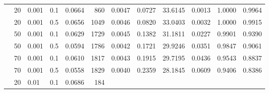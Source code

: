 \begin{table}[H]
{\begin{tabular}{llllrrrrrrrr}
 		\hlineB{5.5}
 		\multirow{12}{*}{amazon} & 20 & 0.001 & 0.1 & {\cellcolor[HTML]{2929FD}} \color[HTML]{F1F1F1} 0.0664 & {\cellcolor[HTML]{8D8DF8}} \color[HTML]{F1F1F1} 860 & {\cellcolor[HTML]{3535FC}} \color[HTML]{F1F1F1} 0.0047 & {\cellcolor[HTML]{DBDBF4}} \color[HTML]{000000} 0.0727 & {\cellcolor[HTML]{2A2AFD}} \color[HTML]{F1F1F1} 33.6145 & {\cellcolor[HTML]{ECECF3}} \color[HTML]{000000} 0.0013 & {\cellcolor[HTML]{0000FF}} \color[HTML]{F1F1F1} 1.0000 & {\cellcolor[HTML]{0505FF}} \color[HTML]{F1F1F1} 0.9964 \\ & 20 & 0.001 & 0.5 & {\cellcolor[HTML]{3838FC}} \color[HTML]{F1F1F1} 0.0656 & {\cellcolor[HTML]{7272F9}} \color[HTML]{F1F1F1} 1049 & {\cellcolor[HTML]{5050FB}} \color[HTML]{F1F1F1} 0.0046 & {\cellcolor[HTML]{CECEF4}} \color[HTML]{000000} 0.0820 & {\cellcolor[HTML]{3F3FFC}} \color[HTML]{F1F1F1} 33.0403 & {\cellcolor[HTML]{E4E4F3}} \color[HTML]{000000} 0.0032 & {\cellcolor[HTML]{0000FF}} \color[HTML]{F1F1F1} 1.0000 & {\cellcolor[HTML]{0C0CFE}} \color[HTML]{F1F1F1} 0.9915 \\ & 50 & 0.001 & 0.1 & {\cellcolor[HTML]{6B6BFA}} \color[HTML]{F1F1F1} 0.0629 & {\cellcolor[HTML]{0E0EFE}} \color[HTML]{F1F1F1} 1729 & {\cellcolor[HTML]{6B6BFA}} \color[HTML]{F1F1F1} 0.0045 & {\cellcolor[HTML]{8383F8}} \color[HTML]{F1F1F1} 0.1382 & {\cellcolor[HTML]{8383F8}} \color[HTML]{F1F1F1} 31.1811 & {\cellcolor[HTML]{9797F7}} \color[HTML]{F1F1F1} 0.0227 & {\cellcolor[HTML]{2828FD}} \color[HTML]{F1F1F1} 0.9901 & {\cellcolor[HTML]{5B5BFA}} \color[HTML]{F1F1F1} 0.9390 \\ & 50 & 0.001 & 0.5 & {\cellcolor[HTML]{ADADF6}} \color[HTML]{000000} 0.0594 & {\cellcolor[HTML]{0606FF}} \color[HTML]{F1F1F1} 1786 & {\cellcolor[HTML]{BCBCF5}} \color[HTML]{000000} 0.0042 & {\cellcolor[HTML]{5555FB}} \color[HTML]{F1F1F1} 0.1721 & {\cellcolor[HTML]{B1B1F6}} \color[HTML]{000000} 29.9246 & {\cellcolor[HTML]{6666FA}} \color[HTML]{F1F1F1} 0.0351 & {\cellcolor[HTML]{3D3DFC}} \color[HTML]{F1F1F1} 0.9847 & {\cellcolor[HTML]{8C8CF8}} \color[HTML]{F1F1F1} 0.9061 \\ & 70 & 0.001 & 0.1 & {\cellcolor[HTML]{8F8FF8}} \color[HTML]{F1F1F1} 0.0610 & {\cellcolor[HTML]{0101FF}} \color[HTML]{F1F1F1} 1817 & {\cellcolor[HTML]{A0A0F7}} \color[HTML]{F1F1F1} 0.0043 & {\cellcolor[HTML]{3B3BFC}} \color[HTML]{F1F1F1} 0.1915 & {\cellcolor[HTML]{B9B9F6}} \color[HTML]{000000} 29.7195 & {\cellcolor[HTML]{4444FC}} \color[HTML]{F1F1F1} 0.0436 & {\cellcolor[HTML]{B9B9F6}} \color[HTML]{000000} 0.9543 & {\cellcolor[HTML]{ADADF6}} \color[HTML]{000000} 0.8837 \\ & 70 & 0.001 & 0.5 & {\cellcolor[HTML]{F0F0F3}} \color[HTML]{000000} 0.0558 & {\cellcolor[HTML]{0000FF}} \color[HTML]{F1F1F1} 1829 & {\cellcolor[HTML]{F0F0F3}} \color[HTML]{000000} 0.0040 & {\cellcolor[HTML]{0000FF}} \color[HTML]{F1F1F1} 0.2359 & {\cellcolor[HTML]{F0F0F3}} \color[HTML]{000000} 28.1845 & {\cellcolor[HTML]{0000FF}} \color[HTML]{F1F1F1} 0.0609 & {\cellcolor[HTML]{F0F0F3}} \color[HTML]{000000} 0.9406 & {\cellcolor[HTML]{F0F0F3}} \color[HTML]{000000} 0.8386 \\ & 20 & 0.01 & 0.1 & {\cellcolor[HTML]{0000FF}} \color[HTML]{F1F1F1} 0.0686 & {\cellcolor[HTML]{F0F0F3}} \color[HTML]{000000} 184 & 
\end{tabular}}
\end{table}
